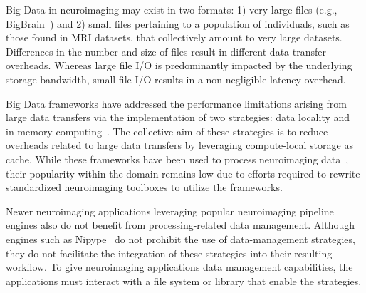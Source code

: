 \documentclass[fleqn,10pt]{wlscirep}
\begin{document}
    Big Data in neuroimaging may exist in two formats: 1) very large files
    (e.g., BigBrain~\cite{amunts2013bigbrain}) and 2) small files pertaining to a
    population of individuals, such as those found in MRI datasets, that
    collectively amount to very large datasets. Differences in the number and
    size of files result in different data transfer overheads. Whereas large
    file I/O is predominantly impacted by the underlying storage bandwidth,
    small file I/O results in a non-negligible latency overhead. 

    Big Data frameworks have addressed the performance limitations arising from large data transfers via the
    implementation of two strategies: data locality and in-memory computing~\cite{zaharia2016apache, rocklin2015dask}.
    The collective aim of these strategies is to reduce overheads related to large data
    transfers by leveraging compute-local storage as cache.
    While these frameworks have been used
    to process neuroimaging data~\cite{rokem2021pan,thunder,boubela2016big},
    their popularity within the domain remains low due to efforts required to
    rewrite standardized neuroimaging toolboxes to utilize the frameworks.
    
    Newer neuroimaging applications leveraging popular neuroimaging pipeline engines
    also do not benefit from processing-related data management.
    Although engines such as Nipype~\cite{nipype}
    do not prohibit the use of data-management
    strategies, they do not facilitate the integration of these strategies into
    their resulting workflow. To give
    neuroimaging applications data management capabilities, the applications
    must interact with a file system or library that enable the strategies.



    
    
\end{document}
